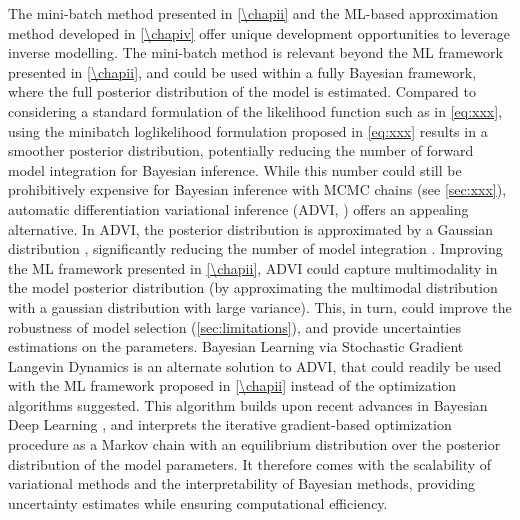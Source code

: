 The mini-batch method presented in \cref{\chapii} and the ML-based approximation method developed in \cref{\chapiv} offer unique development opportunities to leverage inverse modelling.
The mini-batch method is relevant beyond the ML framework presented in \cref{\chapii}, and could be used within a fully Bayesian framework, where the full posterior distribution of the model is estimated. Compared to considering a standard formulation of the likelihood function such as in \cref{eq:xxx}, using the minibatch loglikelihood formulation proposed in \cref{eq:xxx} results in a smoother posterior distribution, potentially reducing the number of forward model integration for Bayesian inference.
% 
While this number could still be prohibitively expensive for Bayesian inference with MCMC chains (see \cref{sec:xxx}), automatic differentiation variational inference (ADVI, \cite{Morningstar2020,Gosh2021}) offers an appealing alternative. In ADVI, the posterior distribution is approximated by a Gaussian distribution \citep{Morningstar2020}, significantly reducing the number of model integration \citep{Morningstar2020}. Improving the ML framework presented in \cref{\chapii}, ADVI could capture multimodality in the model posterior distribution (by approximating the multimodal distribution with a gaussian distribution with large variance). This, in turn, could improve the robustness of model selection (\cref{sec:limitations}), and provide uncertainties estimations on the parameters.
% 
Bayesian Learning via Stochastic Gradient Langevin Dynamics \citep{Welling2011BayesianLV} is an alternate solution to ADVI, that could readily be used with the ML framework proposed in \cref{\chapii} instead of the optimization algorithms suggested. This algorithm builds upon recent advances in Bayesian Deep Learning \citep{Wilson2020}, and interprets the iterative gradient-based optimization procedure as a Markov chain with an equilibrium distribution over the posterior distribution of the model parameters. It therefore comes with the scalability of variational methods and the interpretability of Bayesian methods, providing uncertainty estimates while ensuring computational efficiency.



